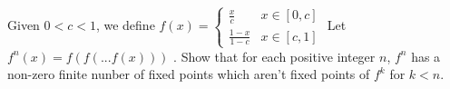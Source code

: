 Given $ 0< c< 1$, we define $f(x) =
 \begin{cases}
 \frac{x}{c} & x  \in [0,c] \\
 \frac{1-x}{1-c} & x \in [c, 1]
\end{cases}   
$
Let $f^{n}(x)=f(f(...f(x)))$ . Show that for each positive integer $n$, $f^{n}$ has a non-zero finite nunber of fixed points which aren't fixed points of $f^k$ for $k<   n$.